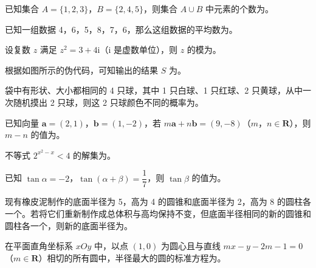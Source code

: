 \begin{question}
已知集合 \(A=\{1,2,3\}\)，\(B=\{2,4,5\}\)，则集合 \(A\cup B\) 中元素的个数为\gkblank{}。

\end{question}
\begin{question}
已知一组数据 4，6，5，8，7，6，那么这组数据的平均数为\gkblank{}。

\end{question}
\begin{question}
设复数 \(z\) 满足 \(z^{2}=3+4\mathrm{i}\)（\(\mathrm{i}\) 是虚数单位），则 \(z\) 的模为\gkblank{}。

\Needspace{0.4\textheight}
\end{question}
\begin{question}
根据如图所示的伪代码，可知输出的结果 \(S\) 为\gkblank{}。
\nopagebreak[4]
\begin{center}\end{center}
\nopagebreak[4]
\end{question}
\begin{question}
袋中有形状、大小都相同的 4 只球，其中 1 只白球、1 只红球、2 只黄球，从中一次随机摸出 2 只球，则这 2 只球颜色不同的概率为\gkblank{}。

\end{question}
\begin{question}
已知向量 \(\boldsymbol a=(2,1)\)，\(\boldsymbol b=(1,-2)\)，若 \(m\boldsymbol a+n\boldsymbol b=(9,-8)\)（\(m\)，\(n\in\mathbf{R}\)），则 \(m-n\) 的值为\gkblank{}。

\end{question}
\begin{question}
不等式 \(2^{x^{2}-x}<4\) 的解集为\gkblank{}。

\end{question}
\begin{question}
已知 \(\tan\alpha=-2\)，\(\tan(\alpha+\beta)=\dfrac{1}{7}\)，则 \(\tan\beta\) 的值为\gkblank{}。

\end{question}
\begin{question}
现有橡皮泥制作的底面半径为 5，高为 4 的圆锥和底面半径为 2，高为 8 的圆柱各一个。若将它们重新制作成总体积与高均保持不变，但底面半径相同的新的圆锥和圆柱各一个，则新的底面半径为\gkblank{}。

\end{question}
\begin{question}
在平面直角坐标系 \(xOy\) 中，以点 \((1,0)\) 为圆心且与直线 \(mx-y-2m-1=0\)（\(m\in\mathbf{R}\)）相切的所有圆中，半径最大的圆的标准方程为\gkblank{}。

\end{question}
